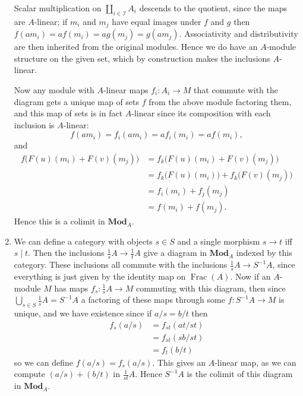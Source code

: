 \documentclass{report}
\newcommand{\cat}[1]{\mathbf{#1}} %
\newcommand{\divides}{\mathrel{\mid}} %
\newcommand{\I}{\mathscr{I}}
\DeclareMathOperator{\Frac}{Frac}
\begin{document}
\begin{enumerate}[label=\textbf{1.4.\Alph*.}]
	      Scalar multiplication on $\amalg_{i\in\I}A_i$ descends to
	      the quotient, since the maps are $A$-linear; if $m_i$ and $m_j$ have
	      equal images under $f$ and $g$ then $f(am_i)=af(m_i)=ag(m_j)=g(am_j)$.
	      Associativity and distributivity are then inherited from the
	      original modules. Hence we do have an $A$-module structure on the
	      given set, which by construction makes the inclusions $A$-linear.

	      Now any module with $A$-linear maps $f_i:A_i\to M$ that commute with
	      the diagram gets a unique map of sets $f$ from the above module
	      factoring them, and this map of sets is in fact $A$-linear since
	      its composition with each inclusion is $A$-linear:
	      \begin{equation*}
		      f(am_i) = f_i(am_i) = af_i(m_i) = af(m_i),
	      \end{equation*}
	      and
	      \begin{align*}
		      f\bigl(F(u)(m_i)+F(v)(m_j)\bigr)
		       & = f_k\bigl(F(u)(m_i) + F(v)(m_j)\bigr)                \\
		       & = f_k\bigl(F(u)(m_i)\bigr) + f_k\bigl(F(v)(m_j)\bigr) \\
		       & = f_i(m_i) + f_j(m_j)                                 \\
		       & = f(m_i) + f(m_j).
	      \end{align*}
	      Hence this is a colimit in $\cat{Mod}_A$.

	\item We can define a category with objects $s\in S$ and a single
	      morphism $s\to t$ iff $s\divides t$. Then the inclusions
	      $\frac{1}{s}A\to\frac{1}{t}A$ give a diagram in $\cat{Mod}_A$
	      indexed by this category. These inclusions all commute with the
	      inclusions $\frac{1}{s}A\to S^{-1}A$, since everything is just given
	      by the identity map on $\Frac(A)$. Now if an $A$-module $M$ has maps
	      $f_s:\frac{1}{s}A\to M$ commuting with this diagram, then since
	      $\bigcup_{s\in S}\frac{1}{s}A=S^{-1}A$ a factoring of these maps
	      through some $f:S^{-1}A\to M$ is unique, and we have existence since
	      if $a/s=b/t$ then
	      \begin{align*}
		      f_s(a/s) & = f_{st}(at/st) \\
		               & = f_{st}(sb/st) \\
		               & = f_t(b/t)
	      \end{align*}
	      so we can define $f(a/s)=f_s(a/s)$. This gives an $A$-linear map, as
	      we can compute $(a/s)+(b/t)$ in $\frac{1}{st}A$. Hence $S^{-1}A$ is the
	      colimit of this diagram in $\cat{Mod}_A$.


\end{enumerate}
\end{document}
